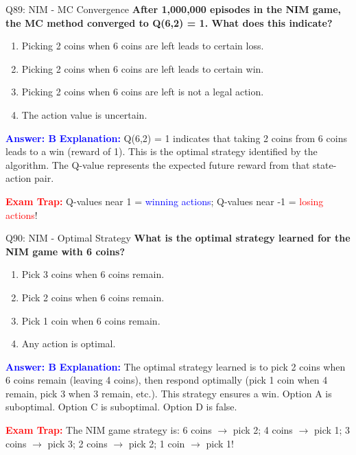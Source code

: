 \documentclass[8pt]{beamer}
\begin{document}
	\begin{frame}{Q89: NIM - MC Convergence}
		\fontsize{6.5}{7.5}\selectfont
		\textbf{After 1,000,000 episodes in the NIM game, the MC method converged to Q(6,2) = 1. What does this indicate?}
		
		\begin{enumerate}
			\item Picking 2 coins when 6 coins are left leads to certain loss.
			\item Picking 2 coins when 6 coins are left leads to certain win.
			\item Picking 2 coins when 6 coins are left is not a legal action.
			\item The action value is uncertain.
		\end{enumerate}
		
		\vspace{0.1cm}
		\textcolor{blue}{\textbf{Answer: B}}
		\vspace{0.1cm}
		\textcolor{blue}{\textbf{Explanation:}} Q(6,2) = 1 indicates that taking 2 coins from 6 coins leads to a win (reward of 1). This is the optimal strategy identified by the algorithm. The Q-value represents the expected future reward from that state-action pair.
		
		\textcolor{red}{\textbf{Exam Trap:}} Q-values near 1 = \textcolor{blue}{winning actions}; Q-values near -1 = \textcolor{red}{losing actions}!
	\end{frame}
	
	\begin{frame}{Q90: NIM - Optimal Strategy}
		\fontsize{6.5}{7.5}\selectfont
		\textbf{What is the optimal strategy learned for the NIM game with 6 coins?}
		
		\begin{enumerate}
			\item Pick 3 coins when 6 coins remain.
			\item Pick 2 coins when 6 coins remain.
			\item Pick 1 coin when 6 coins remain.
			\item Any action is optimal.
		\end{enumerate}
		
		\vspace{0.1cm}
		\textcolor{blue}{\textbf{Answer: B}}
		\vspace{0.1cm}
		\textcolor{blue}{\textbf{Explanation:}} The optimal strategy learned is to pick 2 coins when 6 coins remain (leaving 4 coins), then respond optimally (pick 1 coin when 4 remain, pick 3 when 3 remain, etc.). This strategy ensures a win. Option A is suboptimal. Option C is suboptimal. Option D is false.
		
		\textcolor{red}{\textbf{Exam Trap:}} The NIM game strategy is: 6 coins $\rightarrow$ pick 2; 4 coins $\rightarrow$ pick 1; 3 coins $\rightarrow$ pick 3; 2 coins $\rightarrow$ pick 2; 1 coin $\rightarrow$ pick 1!
	\end{frame}
	
\end{document}

